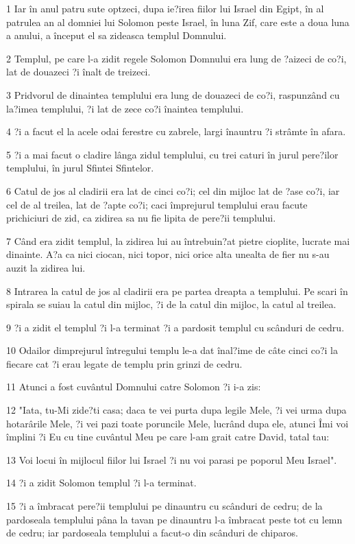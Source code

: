 \par 1 Iar în anul patru sute optzeci, dupa ie?irea fiilor lui Israel din Egipt, în al patrulea an al domniei lui Solomon peste Israel, în luna Zif, care este a doua luna a anului, a început el sa zideasca templul Domnului.
\par 2 Templul, pe care l-a zidit regele Solomon Domnului era lung de ?aizeci de co?i, lat de douazeci ?i înalt de treizeci.
\par 3 Pridvorul de dinaintea templului era lung de douazeci de co?i, raspunzând cu la?imea templului, ?i lat de zece co?i înaintea templului.
\par 4 ?i a facut el la acele odai ferestre cu zabrele, largi înauntru ?i strâmte în afara.
\par 5 ?i a mai facut o cladire lânga zidul templului, cu trei caturi în jurul pere?ilor templului, în jurul Sfintei Sfintelor.
\par 6 Catul de jos al cladirii era lat de cinci co?i; cel din mijloc lat de ?ase co?i, iar cel de al treilea, lat de ?apte co?i; caci împrejurul templului erau facute prichiciuri de zid, ca zidirea sa nu fie lipita de pere?ii templului.
\par 7 Când era zidit templul, la zidirea lui au întrebuin?at pietre cioplite, lucrate mai dinainte. A?a ca nici ciocan, nici topor, nici orice alta unealta de fier nu s-au auzit la zidirea lui.
\par 8 Intrarea la catul de jos al cladirii era pe partea dreapta a templului. Pe scari în spirala se suiau la catul din mijloc, ?i de la catul din mijloc, la catul al treilea.
\par 9 ?i a zidit el templul ?i l-a terminat ?i a pardosit templul cu scânduri de cedru.
\par 10 Odailor dimprejurul întregului templu le-a dat înal?ime de câte cinci co?i la fiecare cat ?i erau legate de templu prin grinzi de cedru.
\par 11 Atunci a fost cuvântul Domnului catre Solomon ?i i-a zis:
\par 12 "Iata, tu-Mi zide?ti casa; daca te vei purta dupa legile Mele, ?i vei urma dupa hotarârile Mele, ?i vei pazi toate poruncile Mele, lucrând dupa ele, atunci Îmi voi împlini ?i Eu cu tine cuvântul Meu pe care l-am grait catre David, tatal tau:
\par 13 Voi locui în mijlocul fiilor lui Israel ?i nu voi parasi pe poporul Meu Israel".
\par 14 ?i a zidit Solomon templul ?i l-a terminat.
\par 15 ?i a îmbracat pere?ii templului pe dinauntru cu scânduri de cedru; de la pardoseala templului pâna la tavan pe dinauntru l-a îmbracat peste tot cu lemn de cedru; iar pardoseala templului a facut-o din scânduri de chiparos.
